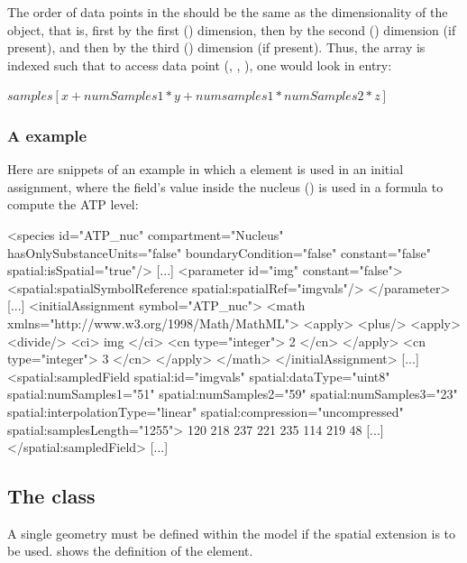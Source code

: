 The order of data points in the  should be the same as the dimensionality of the object, that is, first by the first () dimension, then by the second () dimension (if present), and then by the third () dimension (if present).  Thus, the array is indexed such that to access data point (, , ), one would look in entry:

$samples[x + numSamples1*y + numsamples1*numSamples2*z]$

\subsubsection{A \SampledField example}
Here are snippets of an example in which a \SampledField element is used in an initial assignment, where the field's value inside the nucleus () is used in a formula to compute the ATP level:

\begin{example}
[...]
  <species id="ATP_nuc" compartment="Nucleus" hasOnlySubstanceUnits="false"
           boundaryCondition="false" constant="false" spatial:isSpatial="true"/>
[...]
  <parameter id="img" constant="false">
    <spatial:spatialSymbolReference spatial:spatialRef="imgvals"/>
  </parameter>
[...]
  <initialAssignment symbol="ATP_nuc">
    <math xmlns="http://www.w3.org/1998/Math/MathML">
      <apply>
        <plus/>
        <apply>
          <divide/>
          <ci> img </ci>
          <cn type="integer"> 2 </cn>
        </apply>
        <cn type="integer"> 3 </cn>
      </apply>
    </math>
  </initialAssignment>
[...]
  <spatial:sampledField spatial:id="imgvals" spatial:dataType="uint8"
           spatial:numSamples1="51" spatial:numSamples2="59"
           spatial:numSamples3="23" spatial:interpolationType="linear"
           spatial:compression="uncompressed" spatial:samplesLength="1255">
    120 218 237 221 235 114 219 48 [...]
  </spatial:sampledField>
[...]
\end{example}


\subsection{The  class}
\label{geometry-class}
\label{listofcoordinatecomponents-class}
\label{listofdomaintypes-class}
\label{listofdomains-class}
\label{listofadjacentdomains-class}
\label{listofgeometrydefinitions-class}
\label{listofsampledfields-class}

A single geometry must be defined within the model if the spatial extension is to be used.  shows the definition of the \Geometry element.
 
